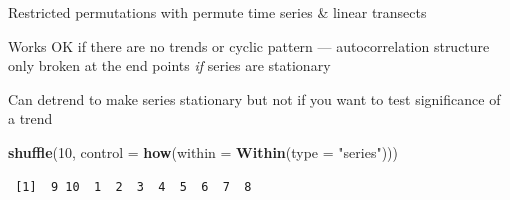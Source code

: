 \documentclass[10pt,ignorenonframetext,compress, aspectratio=169]{beamer}
\newenvironment{Shaded}{\begin{snugshade}}{\end{snugshade}}
\newcommand{\KeywordTok}[1]{\textcolor[rgb]{0.13,0.29,0.53}{\textbf{{#1}}}}
\newcommand{\DataTypeTok}[1]{\textcolor[rgb]{0.13,0.29,0.53}{{#1}}}
\newcommand{\DecValTok}[1]{\textcolor[rgb]{0.00,0.00,0.81}{{#1}}}
\newcommand{\StringTok}[1]{\textcolor[rgb]{0.31,0.60,0.02}{{#1}}}
\newcommand{\NormalTok}[1]{{#1}}
\begin{document}
\begin{frame}[fragile]{Restricted permutations with permute \textbar{}
time series \& linear transects}

Works OK if there are no trends or cyclic pattern --- autocorrelation
structure only broken at the end points \emph{if} series are stationary

Can detrend to make series stationary but not if you want to test
significance of a trend

\scriptsize

\begin{Shaded}
\begin{Highlighting}[]
\KeywordTok{shuffle}\NormalTok{(}\DecValTok{10}\NormalTok{, }\DataTypeTok{control =} \KeywordTok{how}\NormalTok{(}\DataTypeTok{within =} \KeywordTok{Within}\NormalTok{(}\DataTypeTok{type =} \StringTok{"series"}\NormalTok{)))}
\end{Highlighting}
\end{Shaded}

\begin{verbatim}
 [1]  9 10  1  2  3  4  5  6  7  8
\end{verbatim}

\normalsize

\end{frame}
\end{document}
